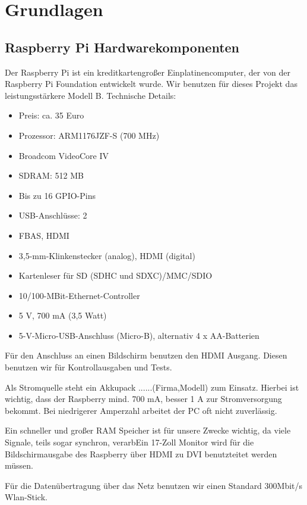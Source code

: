 \documentclass[12pt]{article}
\begin{document}
\section{Grundlagen}

\subsection{Raspberry Pi Hardwarekomponenten}
Der Raspberry Pi ist ein kreditkartengroßer Einplatinencomputer, der von der Raspberry Pi Foundation entwickelt wurde.
Wir benutzen für dieses Projekt das leistungsstärkere Modell B.
Technische Details:

\begin{itemize}
\item Preis: ca. 35 Euro
\item Prozessor: ARM1176JZF-S (700 MHz)
\item Broadcom VideoCore IV
\item SDRAM: 512 MB
\item Bis zu 16 GPIO-Pins
\item USB-Anschlüsse: 2
\item FBAS, HDMI
\item 3,5-mm-Klinkenstecker (analog), HDMI (digital)
\item Kartenleser für SD (SDHC und SDXC)/MMC/SDIO
\item 10/100-MBit-Ethernet-Controller 
\item 5 V, 700 mA (3,5 Watt)
\item 5-V-Micro-USB-Anschluss (Micro-B), alternativ 4 x AA-Batterien
\end{itemize}

Für den Anschluss an einen Bildschirm benutzen den HDMI Ausgang.
Diesen benutzen wir für Kontrollausgaben und Tests.

Als Stromquelle steht ein Akkupack ......(Firma,Modell) zum Einsatz. 
Hierbei ist wichtig, dass der Raspberry mind. 700 mA, besser 1 A zur Stromversorgung bekommt. 
Bei niedrigerer Amperzahl arbeitet der PC oft nicht zuverlässig.

Ein schneller und großer RAM Speicher ist für unsere Zwecke wichtig, da viele Signale, teils sogar synchron, verarbEin 17-Zoll Monitor wird für die Bildschirmausgabe des Raspberry über HDMI zu DVI benutzteitet werden müssen.

Für die Datenübertragung über das Netz benutzen wir einen Standard 300Mbit/s Wlan-Stick.
\end{document}
